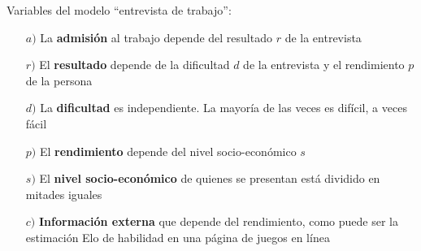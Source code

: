 \documentclass[a4paper,10pt]{article}
\begin{document}
Variables del modelo ``entrevista de trabajo'':
\begin{itemize}
 \item[$a)$] La \textbf{admisi\'on} al trabajo depende del resultado $r$ de la entrevista
 \item[$r)$] El \textbf{resultado} depende de la dificultad $d$ de la entrevista y el rendimiento $p$ de la persona
 \item[$d)$] La \textbf{dificultad} es independiente. La mayor\'ia de las veces es dif\'icil, a veces f\'acil
 \item[$p)$] El \textbf{rendimiento} depende del nivel socio-econ\'omico $s$
 \item[$s)$] El \textbf{nivel socio-econ\'omico} de quienes se presentan est\'a dividido en mitades iguales
 \item[$c)$] \textbf{Informaci\'on externa} que depende del rendimiento, como puede ser la estimaci\'on Elo de habilidad en una p\'agina de juegos en l\'inea
\end{itemize}

\vspace{0.3cm}
\end{document}
